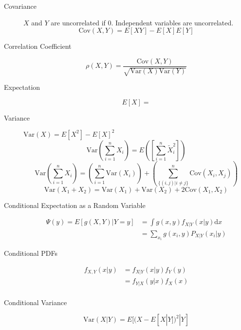 \documentclass[8pt]{article}
\newcommand{\dd}[1]{\mathrm{d}{#1}}
\begin{document}

\begin{multicols}{2}
  \begin{description}
  \item[Covariance] $X$ and $Y$ are uncorrelated if 0. Independent
    variables are uncorrelated.
    $$\text{Cov}(X,Y)=E[XY]-E[X]E[Y]$$
  \item[Correlation Coefficient]
    $$\rho(X,Y)=\frac{\text{Cov}(X,Y)}{\sqrt{\text{Var}(X)\text{Var}(Y)}}$$
  \item[Expectation] $$E[X] = $$
  \item[Variance] $\text{Var}(X) = E[X^2] - E[X]^2$
    $$\text{Var}\left(\sum_{i=1}^{n}X_i\right) =
    E\left(\left[\sum_{i=1}^{n}\tilde{X}_i^2\right]\right)$$
    $$\text{Var}\left(\sum_{i=1}^{n}X_i\right) =
    \left(\sum_{i=1}^{n}\text{Var}(X_i)\right) + \left(\sum_{\{(i,j) |
        i\not= j\}}^{n}\text{Cov}(X_i, X_j)\right)$$
    $$\text{Var}(X_1 + X_2) = \text{Var}(X_1) + \text{Var}(X_2) +
    2\text{Cov}(X_1,X_2)$$
  \item[Conditional Expectation as a Random Variable]
    \begin{equation*}
      \begin{aligned}
        \Psi(y) = E[g(X,Y)|Y=y] &= \int g(x,y) f_{X|Y}(x|y) \dd{x} \\
        &= \sum_{x_i} g(x_i,y) P_{X|Y}(x_i|y)
      \end{aligned}
    \end{equation*}
  \item[Conditional PDFs]
    \begin{equation*}
      \begin{aligned}
        f_{X,Y}(x|y) &= f_{X|Y}(x|y)f_Y(y) \\
        &= f_{Y|X}(y|x)f_X(x) \\
      \end{aligned}
    \end{equation*}
  \item[Conditional Variance]
    $$ \text{Var}(X|Y) = E[(X-E[X|Y])^2|Y] $$
  \end{description}
\end{multicols}
\end{document}
